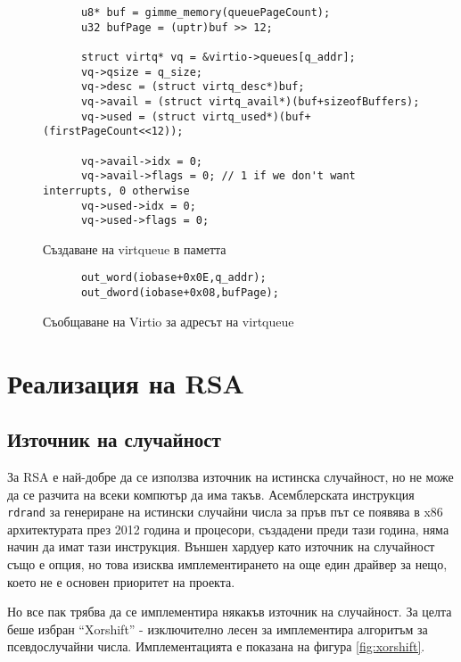   \begin{figure}[htpb]
    \centering
    \begin{verbatim}
      u8* buf = gimme_memory(queuePageCount);
      u32 bufPage = (uptr)buf >> 12;

      struct virtq* vq = &virtio->queues[q_addr];
      vq->qsize = q_size;
      vq->desc = (struct virtq_desc*)buf;
      vq->avail = (struct virtq_avail*)(buf+sizeofBuffers);
      vq->used = (struct virtq_used*)(buf+(firstPageCount<<12));

      vq->avail->idx = 0;
      vq->avail->flags = 0; // 1 if we don't want interrupts, 0 otherwise
      vq->used->idx = 0;
      vq->used->flags = 0;
    \end{verbatim}
    \caption{Създаване на virtqueue в паметта}
    \label{fig:preparing-virtqueue}
  \end{figure}

  \begin{figure}[htpb]
    \centering
    \begin{verbatim}
      out_word(iobase+0x0E,q_addr);
      out_dword(iobase+0x08,bufPage);
    \end{verbatim}
    \caption{Съобщаване на Virtio за адресът на virtqueue}
    \label{fig:giving-virtqueue}
  \end{figure}

\section{Реализация на RSA}
  \subsection{Източник на случайност}
  За RSA е най-добре да се използва източник на истинска случайност, но не може да се разчита на всеки компютър да има такъв. Асемблерската инструкция {\tt rdrand} за генериране на истински случайни числа за пръв път се появява в x86 архитектурата през 2012 година\cite{intel-rdrand} и процесори, създадени преди тази година, няма начин да имат тази инструкция. Външен хардуер като източник на случайност също е опция, но това изисква имплементирането на още един драйвер за нещо, което не е основен приоритет на проекта.

  Но все пак трябва да се имплементира някакъв източник на случайност. За целта беше избран ``Xorshift'' - изключително лесен за имплементира алгоритъм за псевдослучайни числа. Имплементацията е показана на фигура \ref{fig:xorshift}.


